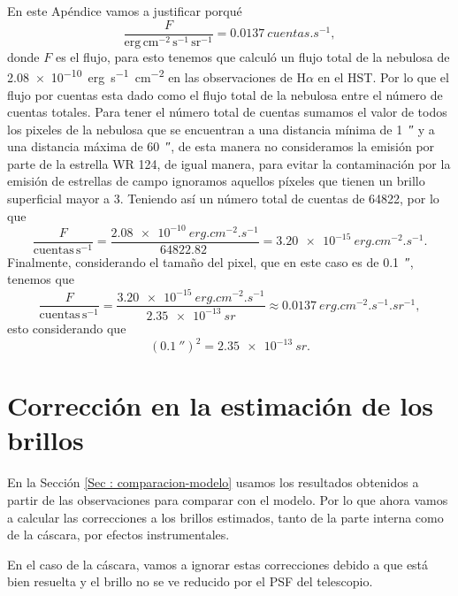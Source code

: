 \documentclass{book}
\begin{document}
En este Apéndice vamos a justificar porqué
\begin{equation}
    \frac{F}{\mathrm{erg\,cm^{-2}\,s^{-1}\,sr^{-1}}}=\SI{0.0137}{cuentas.s^{-1}},
\end{equation}
donde $F$ es el flujo, para esto tenemos que \cite{Grosdidier:1998} calculó un flujo total de la nebulosa de \SI{2.08e-10}{erg.s^{-1}.cm^{-2}} en las observaciones de H$\alpha$ en el HST. Por lo que el flujo por cuentas esta dado como el flujo total de la nebulosa entre el número de cuentas totales. Para tener el número total de cuentas sumamos el valor de todos los pixeles de la nebulosa que se encuentran a una distancia mínima de \SI{1}{\arcsecond} y a una distancia máxima de \SI{60}{\arcsecond}, de esta manera no consideramos la emisión por parte de la estrella WR 124, de igual manera, para evitar la contaminación por la emisión de estrellas de campo ignoramos aquellos píxeles que tienen un brillo superficial mayor a 3. Teniendo así un número total de cuentas de \SI{64 822}{}, por lo que 
\begin{equation}
    \frac{F}{\mathrm{cuentas\,s^{-1}}}=\frac{\SI{2.08e-10}{erg.cm^{-2}.s^{-1}}}{\SI{64 822.82}{}}=\SI{3.20e-15}{erg.cm^{-2}
    .s^{-1}}.
\end{equation}
Finalmente, considerando el tamaño del pixel, que en este caso es de \SI{0.1}{\arcsecond}, tenemos que
\begin{equation}
    \frac{F}{\mathrm{cuentas\,s^{-1}}}=\frac{\SI{3.20e-15}{erg.cm^{-2}
    .s^{-1}}}{\SI{2.35e-13}{sr}}\approx\SI{0.0137}{erg.cm^{-2}.s^{-1}.sr^{-1}},
\end{equation}
esto considerando que
\begin{equation}
    (\SI{0.1}{\arcsecond})^2=\SI{2.35e-13}{sr}.
\end{equation}

\chapter{Corrección en la estimación de los brillos}\label{App:brillos}

En la Sección \ref{Sec : comparacion-modelo} usamos los resultados obtenidos a partir de las observaciones para comparar con el modelo. Por lo que ahora vamos a calcular las correcciones a los brillos estimados, tanto de la parte interna como de la cáscara, por efectos instrumentales.

En el caso de la cáscara, vamos a ignorar estas correcciones debido a que está bien resuelta y  el brillo no se ve reducido por el PSF del telescopio.
\end{document}
